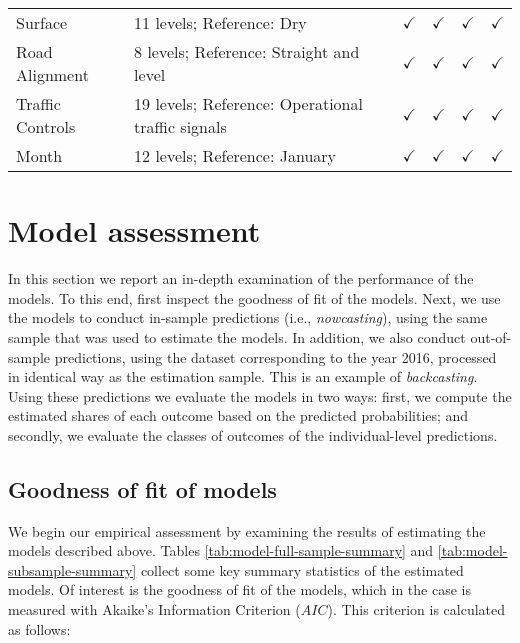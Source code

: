 \documentclass[]{elsarticle} %
\begin{document}
\begin{table}
{\begin{tabular}[t]{llllll}
\hspace{1em}Surface & 11 levels; Reference: Dry & $\checkmark$ & $\checkmark$ & $\checkmark$ & $\checkmark$\\
\rowcolor{gray!6}  \hspace{1em}Road Alignment & 8 levels; Reference: Straight and level & $\checkmark$ & $\checkmark$ & $\checkmark$ & $\checkmark$\\
\hspace{1em}Traffic Controls & 19 levels; Reference: Operational traffic signals & $\checkmark$ & $\checkmark$ & $\checkmark$ & $\checkmark$\\
\rowcolor{gray!6}  \hspace{1em}Month & 12 levels; Reference: January & $\checkmark$ & $\checkmark$ & $\checkmark$ & $\checkmark$\\
\bottomrule
\end{tabular}}
\end{table}

\hypertarget{sec:assessment}{%
\section{Model assessment}\label{sec:assessment}}

In this section we report an in-depth examination of the performance of
the models. To this end, first inspect the goodness of fit of the
models. Next, we use the models to conduct in-sample predictions (i.e.,
\emph{nowcasting}), using the same sample that was used to estimate the
models. In addition, we also conduct out-of-sample predictions, using
the dataset corresponding to the year 2016, processed in identical way
as the estimation sample. This is an example of \emph{backcasting}.
Using these predictions we evaluate the models in two ways: first, we
compute the estimated shares of each outcome based on the predicted
probabilities; and secondly, we evaluate the classes of outcomes of the
individual-level predictions.

\hypertarget{sec:goodness-of-fit}{%
\subsection{Goodness of fit of models}\label{sec:goodness-of-fit}}

We begin our empirical assessment by examining the results of estimating
the models described above. Tables \ref{tab:model-full-sample-summary}
and \ref{tab:model-subsample-summary} collect some key summary
statistics of the estimated models. Of interest is the goodness of fit
of the models, which in the case is measured with Akaike's Information
Criterion (\(AIC\)). This criterion is calculated as follows:
\end{document}
